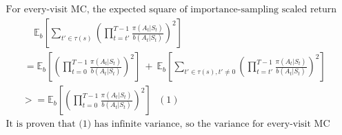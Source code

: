 \documentclass{article}
\begin{document}

\[
  \begin{aligned}
    &\text{ For every-visit MC, the expected square of importance-sampling scaled return for a state s is: } \\
    &\qquad \quad\ \mathbb{E}_b[\sum_{t'\in\tau(s)}(\prod_{t=t'}^{T-1} \frac {\pi(A_t|S_t)} {b(A_t|S_t)})^2]\\
    &\qquad \ = \mathbb{E}_b[(\prod_{t=0}^{T-1} \frac {\pi(A_t|S_t)} {b(A_t|S_t)})^2] \ + \
                \mathbb{E}_b[\sum_{t'\in\tau(s), t'\not=0}(\prod_{t=t'}^{T-1} \frac {\pi(A_t|S_t)} {b(A_t|S_t)})^2]\\
    &\qquad >=  \mathbb{E}_b[(\prod_{t=0}^{T-1} \frac {\pi(A_t|S_t)} {b(A_t|S_t)})^2] \ \ \ (1) \\
    &\text{ It is proven that (1) has infinite variance, so the variance for every-visit MC estimator is still infinite.} \\
  \end{aligned}
\]
\end{document}
